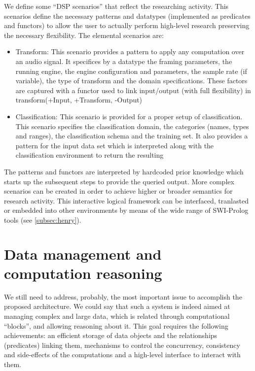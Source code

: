 \documentclass[runningheads]{llncs}
\begin{document}
We define some ``DSP scenarios'' that reflect the researching activity. This scenarios define the necessary patterns and datatypes (implemented as predicates and functors) to allow the user to actually perform high-level research preserving the necessary flexibility. The elemental scenarios are:

\begin{itemize}
 \item Transform: This scenario provides a pattern to apply any computation over an audio signal. It specifices by a datatype the framing parameters, the running engine, the engine configuration and parameters, the sample rate (if variable), the type of transform and the domain specifications. These factors are captured with a functor used to link input/output (with full flexibility) in transform(+Input, +Transform, -Output)
 \item Classification: This scenario is provided for a proper setup of classification. This scenario specifies the classification domain, the categories (names, types and ranges), the classification schema and the training set. It also provides a pattern for the input data set which is interpreted along with the classification environment to return the resulting 
\end{itemize}

The patterns and functors are interpreted by hardcoded prior knowledge which starts up the subsequent steps to provide the queried output. More complex scenarios can be created in order to achieve higher or broader semantics for research activity. This interactive logical framework can be interfaced, tranlasted or embedded into other environments by means of the wide range of SWI-Prolog tools (see \ref{subsec:henry}).

\section{Data management and computation reasoning}\label{subsec:datamanage}

We still need to address, probably, the most important issue to accomplish the proposed architecture. We could say that such a system is indeed aimed at managing complex and large data, which is related through computational ``blocks'', and allowing reasoning about it. This goal requires the following achievements: an efficient storage of data objects and the relationships (predicates) linking them, mechanisms to control the concurrency, consistency and side-effects of the computations and a high-level interface to interact with them.
\end{document}

